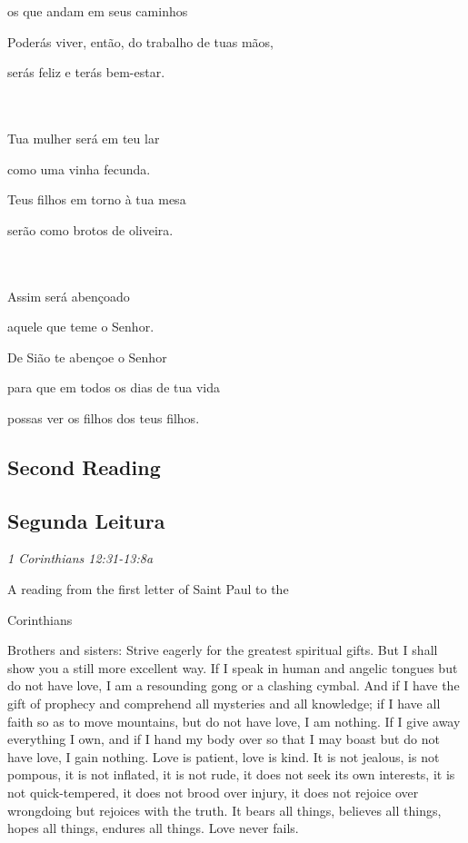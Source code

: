 \documentclass[10pt,a5]{article}
\newcommand \subsect[2] {\subsection*{#1} \switchcolumn \subsection*{#2} \switchcolumn*}
\begin{document}
\begin{paracol}{2}
\hspace*{2em}os que andam em seus caminhos

Poderás viver, então, do trabalho de tuas mãos,

\hspace*{2em}serás feliz e terás bem-estar.

\\
\\

Tua mulher será em teu lar

\hspace*{2em}como uma vinha fecunda.

Teus filhos em torno à tua mesa 

\hspace*{2em}serão como brotos de oliveira.

\\
\\

Assim será abençoado 

\hspace*{2em}aquele que teme o Senhor.

De Sião te abençoe o Senhor 

\hspace*{2em}para que em todos os dias de tua vida

\hspace*{2em}possas ver os filhos dos teus filhos.


 \switchcolumn*

 \subsect{Second Reading}{Segunda Leitura}

 \textit{1 Corinthians 12:31-13:8a}

\hspace{2em} A reading from the first letter of Saint Paul to the 

\hspace{2em} Corinthians

Brothers and sisters: Strive eagerly for the greatest spiritual gifts.
But I shall show you a still more excellent way.  
If I speak in human and angelic tongues but do not have love, I am a resounding gong or a clashing cymbal.  And if I have the gift of prophecy and comprehend all mysteries and all knowledge; if I have all faith so as to move mountains, but do not have love, I am nothing.  If I give away everything I own, and if I hand my body over so that I may boast but do not have love, I gain nothing.  
Love is patient, love is kind.  It is not jealous, is not pompous, it is not inflated, it is not rude, it does not seek its own interests, it is not quick-tempered, it does not brood over injury, it does not rejoice over wrongdoing but rejoices with the truth.  It bears all things, believes all things, hopes all things, endures all things.  Love never fails.\\


\end{paracol}
\end{document}
